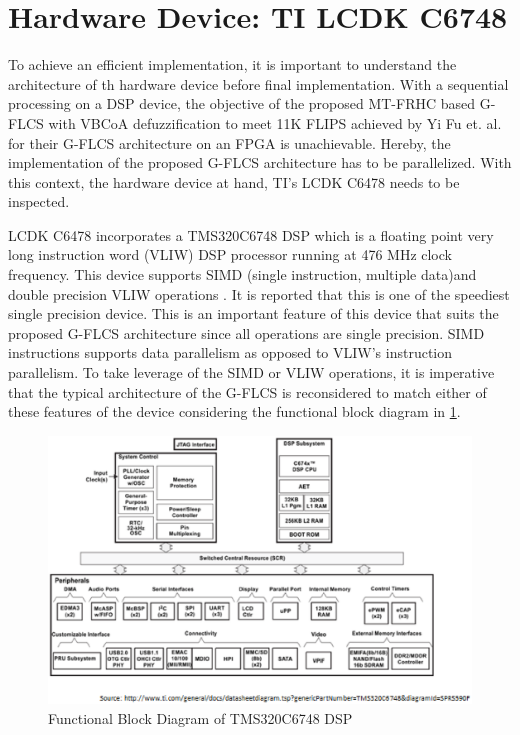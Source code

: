 \section{Hardware Device: TI LCDK C6748}
To achieve an efficient implementation, it is important to understand the architecture of th hardware device before final implementation. With a sequential processing on a DSP device, the objective of the proposed MT-FRHC based G-FLCS with VBCoA defuzzification to meet 11K FLIPS achieved by Yi Fu et. al. \cite{Fu2010} for their G-FLCS architecture on an FPGA is unachievable. Hereby, the implementation of the proposed G-FLCS architecture has to be parallelized. With this context, the hardware device at hand, TI's LCDK C6478 needs to be inspected.

LCDK C6478 incorporates a TMS320C6748 DSP which is a floating point very long instruction word (VLIW) DSP processor running at 476 MHz clock frequency. This device supports SIMD (single instruction, multiple data)and double precision VLIW operations \cite{TexasInstruments2013}. It is reported that this is one of the speediest single precision device. This is an important feature of this device that suits the proposed G-FLCS architecture since all operations are single precision. SIMD instructions supports data parallelism as opposed to VLIW's instruction parallelism. To take leverage of the SIMD or VLIW operations, it is imperative that the typical architecture of the G-FLCS is reconsidered to match either of these features of the device considering the functional block diagram in \ref{fig:functional_block}. 

\begin{figure}[h]
\centering
\includegraphics[width=0.9\linewidth]{Chapter4/chapter4/functional_block}
\caption{Functional Block Diagram of TMS320C6748 DSP}
\label{fig:functional_block}
\end{figure}

